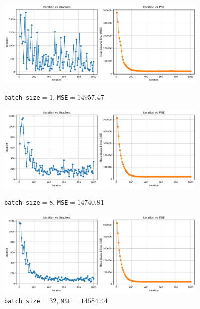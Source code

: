 \documentclass[polish,12pt,a4paper]{extarticle}
\begin{document}
\begin{figure}
    \centering
    \begin{minipage}[b]{0.48\textwidth}
    \includegraphics[width=0.9\textwidth]{data/b1.png}
    \caption{\texttt{batch size}$=1$, \texttt{MSE}$=14957.47$}
    \end{minipage}
     \hspace{0.02\textwidth}
    \begin{minipage}[b]{0.48\textwidth}
    \includegraphics[width=0.9\textwidth]{data/b8.png}
    \caption{\texttt{batch size}$=8$, \texttt{MSE}$=14740.81$}
    \end{minipage}
    \hspace{0.02\textwidth}
    \begin{minipage}[b]{0.48\textwidth}
    \includegraphics[width=0.9\textwidth]{data/b32.png}
    \caption{\texttt{batch size}$=32$, \texttt{MSE}$=14584.44$}
    \end{minipage}
     \hspace{0.02\textwidth}
    \begin{minipage}[b]{0.48\textwidth}

\end{minipage}
\end{figure}
\end{document}
